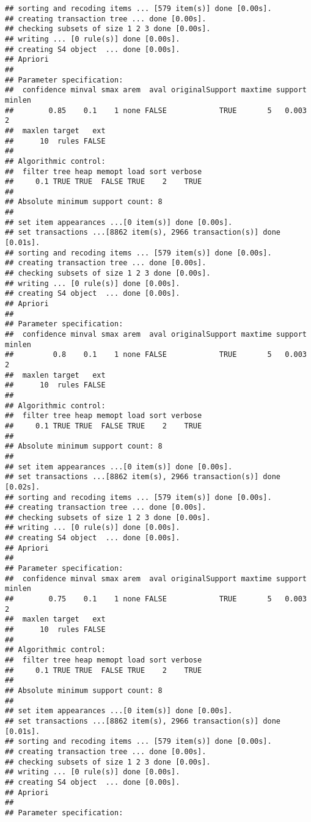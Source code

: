 \documentclass[]{article}
\begin{document}
\begin{verbatim}
## sorting and recoding items ... [579 item(s)] done [0.00s].
## creating transaction tree ... done [0.00s].
## checking subsets of size 1 2 3 done [0.00s].
## writing ... [0 rule(s)] done [0.00s].
## creating S4 object  ... done [0.00s].
## Apriori
## 
## Parameter specification:
##  confidence minval smax arem  aval originalSupport maxtime support minlen
##        0.85    0.1    1 none FALSE            TRUE       5   0.003      2
##  maxlen target   ext
##      10  rules FALSE
## 
## Algorithmic control:
##  filter tree heap memopt load sort verbose
##     0.1 TRUE TRUE  FALSE TRUE    2    TRUE
## 
## Absolute minimum support count: 8 
## 
## set item appearances ...[0 item(s)] done [0.00s].
## set transactions ...[8862 item(s), 2966 transaction(s)] done [0.01s].
## sorting and recoding items ... [579 item(s)] done [0.00s].
## creating transaction tree ... done [0.00s].
## checking subsets of size 1 2 3 done [0.00s].
## writing ... [0 rule(s)] done [0.00s].
## creating S4 object  ... done [0.00s].
## Apriori
## 
## Parameter specification:
##  confidence minval smax arem  aval originalSupport maxtime support minlen
##         0.8    0.1    1 none FALSE            TRUE       5   0.003      2
##  maxlen target   ext
##      10  rules FALSE
## 
## Algorithmic control:
##  filter tree heap memopt load sort verbose
##     0.1 TRUE TRUE  FALSE TRUE    2    TRUE
## 
## Absolute minimum support count: 8 
## 
## set item appearances ...[0 item(s)] done [0.00s].
## set transactions ...[8862 item(s), 2966 transaction(s)] done [0.02s].
## sorting and recoding items ... [579 item(s)] done [0.00s].
## creating transaction tree ... done [0.00s].
## checking subsets of size 1 2 3 done [0.00s].
## writing ... [0 rule(s)] done [0.00s].
## creating S4 object  ... done [0.00s].
## Apriori
## 
## Parameter specification:
##  confidence minval smax arem  aval originalSupport maxtime support minlen
##        0.75    0.1    1 none FALSE            TRUE       5   0.003      2
##  maxlen target   ext
##      10  rules FALSE
## 
## Algorithmic control:
##  filter tree heap memopt load sort verbose
##     0.1 TRUE TRUE  FALSE TRUE    2    TRUE
## 
## Absolute minimum support count: 8 
## 
## set item appearances ...[0 item(s)] done [0.00s].
## set transactions ...[8862 item(s), 2966 transaction(s)] done [0.01s].
## sorting and recoding items ... [579 item(s)] done [0.00s].
## creating transaction tree ... done [0.00s].
## checking subsets of size 1 2 3 done [0.00s].
## writing ... [0 rule(s)] done [0.00s].
## creating S4 object  ... done [0.00s].
## Apriori
## 
## Parameter specification:

\end{verbatim}
\end{document}
